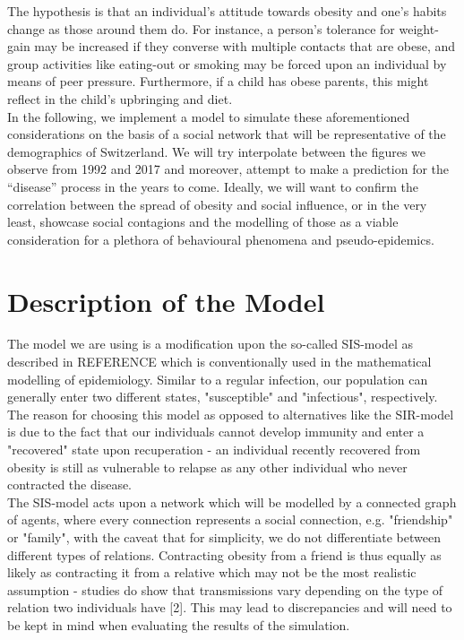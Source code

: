 \documentclass[11pt]{article}
\begin{document}
The hypothesis is that an individual’s attitude towards obesity and one’s habits change as those around them do. For instance, a person’s tolerance for weight-gain may be increased if they converse with multiple contacts that are obese, and group activities like eating-out or smoking may be forced upon an individual by means of peer pressure. Furthermore, if a child has obese parents, this might reflect in the child’s upbringing and diet.\\

In the following, we implement a model to simulate these aforementioned considerations on the basis of a social network that will be representative of the demographics of Switzerland. We will try interpolate between the figures we observe from 1992 and 2017 and moreover, attempt to make a prediction for the “disease” process in the years to come. Ideally, we will want to confirm the correlation between the spread of obesity and social influence, or in the very least, showcase social contagions and the modelling of those as a viable consideration for a plethora of behavioural phenomena and pseudo-epidemics.


\section{Description of the Model}

The model we are using is a modification upon the so-called SIS-model as described in REFERENCE which is conventionally used in the mathematical modelling of epidemiology. Similar to a regular infection, our population can generally enter two different states, "susceptible" and "infectious", respectively. The reason for choosing this model as opposed to alternatives like the SIR-model is due to the fact that our individuals cannot develop immunity and enter a "recovered" state upon recuperation - an individual recently recovered from obesity is still as vulnerable to relapse as any other individual who never contracted the disease.  \\

The SIS-model acts upon a network which will be modelled by a connected graph of agents, where every connection represents a social connection, e.g. "friendship" or "family", with the caveat that for simplicity, we do not differentiate between different types of relations. Contracting obesity from a friend is thus equally as likely as contracting it from a relative which may not be the most realistic assumption - studies do show that transmissions vary depending on the type of relation two individuals have [2]. This may lead to discrepancies and  will need to be kept in mind when evaluating the results of the simulation. \\
\end{document}
